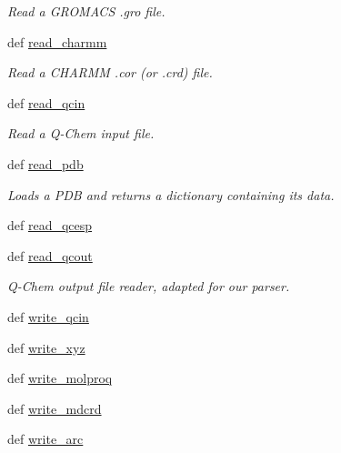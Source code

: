 \begin{DoxyCompactItemize}
\begin{DoxyCompactList}\small\item\em Read a G\-R\-O\-M\-A\-C\-S .gro file. \end{DoxyCompactList}\item 
def \hyperlink{classforcebalance_1_1molecule_1_1Molecule_a8b8d3444945cab760288f28996787855}{read\-\_\-charmm}
\begin{DoxyCompactList}\small\item\em Read a C\-H\-A\-R\-M\-M .cor (or .crd) file. \end{DoxyCompactList}\item 
def \hyperlink{classforcebalance_1_1molecule_1_1Molecule_a003b182b54de4473c4691ae1474b1ada}{read\-\_\-qcin}
\begin{DoxyCompactList}\small\item\em Read a Q-\/\-Chem input file. \end{DoxyCompactList}\item 
def \hyperlink{classforcebalance_1_1molecule_1_1Molecule_afadc87c0cc32dc73558cd901a4c64dd4}{read\-\_\-pdb}
\begin{DoxyCompactList}\small\item\em Loads a P\-D\-B and returns a dictionary containing its data. \end{DoxyCompactList}\item 
def \hyperlink{classforcebalance_1_1molecule_1_1Molecule_a27fb6201b435a3b205ae62f605256f3d}{read\-\_\-qcesp}
\item 
def \hyperlink{classforcebalance_1_1molecule_1_1Molecule_a8c9e71843e7123c57c43c24af2d84f25}{read\-\_\-qcout}
\begin{DoxyCompactList}\small\item\em Q-\/\-Chem output file reader, adapted for our parser. \end{DoxyCompactList}\item 
def \hyperlink{classforcebalance_1_1molecule_1_1Molecule_af46b2ba6ef777cf8301bc16e157c724d}{write\-\_\-qcin}
\item 
def \hyperlink{classforcebalance_1_1molecule_1_1Molecule_adc6620e8287edabe161442de12295f75}{write\-\_\-xyz}
\item 
def \hyperlink{classforcebalance_1_1molecule_1_1Molecule_aba14226f272f91c91ecf7060ff136a2b}{write\-\_\-molproq}
\item 
def \hyperlink{classforcebalance_1_1molecule_1_1Molecule_aab5ea35ab9d68559fd6ea7b747c2bddb}{write\-\_\-mdcrd}
\item 
def \hyperlink{classforcebalance_1_1molecule_1_1Molecule_a95782abfb36e7080a1b98bfad2ced4f3}{write\-\_\-arc}

\end{DoxyCompactItemize}
